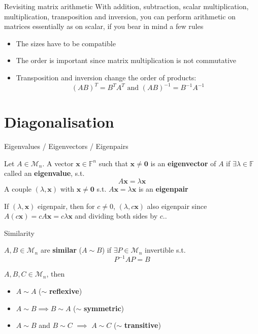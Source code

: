 \documentclass{beamer}
\def\IF{\mathbb{F}}
\def\bx{\mathbf{x}}
\def\b0{\mathbf{0}}
\def\M{\mathcal{M}}
\begin{document}
\begin{frame}{Revisiting matrix arithmetic}
With addition, subtraction, scalar multiplication, multiplication, transposition and inversion, you can perform arithmetic on matrices essentially as on scalar, if you bear in mind a few rules
\begin{itemize}
\item The sizes have to be compatible
\item The order is important since matrix multiplication is not commutative
\item Transposition and inversion change the order of products:
\[
(AB)^T=B^TA^T\textrm{ and }(AB)^{-1}=B^{-1}A^{-1}
\]
\end{itemize}
\end{frame}


\section{Diagonalisation}

\begin{frame}{Eigenvalues / Eigenvectors / Eigenpairs}
\begin{definition}
Let $A\in\M_n$. A vector $\bx\in\IF^n$ such that $\bx\neq\b0$ is an \textbf{eigenvector} of $A$ if $\exists\lambda\in\IF$ called an \textbf{eigenvalue}, s.t.
\[
A\bx=\lambda \bx
\]
A couple $(\lambda,\bx)$ with $\bx\neq\b0$ s.t. $A\bx=\lambda\bx$ is an \textbf{eigenpair}
\end{definition}
If $(\lambda,\bx)$ eigenpair, then for $c\neq 0$, $(\lambda,c\bx)$ also eigenpair since $A(c\bx)=cA\bx=c\lambda\bx$ and dividing both sides by $c$..
\end{frame}


\begin{frame}{Similarity}
\begin{definition}[Similarity]
$A,B\in\M_n$ are \textbf{similar} ($A\sim B$) if $\exists P\in\M_n$ invertible s.t.
\[
P^{-1}AP=B
\]
\end{definition}
\begin{theorem}
$A,B,C\in\M_n$, then
\begin{itemize}
	\item $A\sim A$ \hfill ($\sim$ \textbf{reflexive})
	\item $A\sim B\implies B\sim A$ \hfill ($\sim$ \textbf{symmetric})
	\item $A\sim B$ and $B\sim C$ $\implies$ $A\sim C$ \hfill ($\sim$ \textbf{transitive})
\end{itemize}
\end{theorem}
\end{frame}
\end{document}
